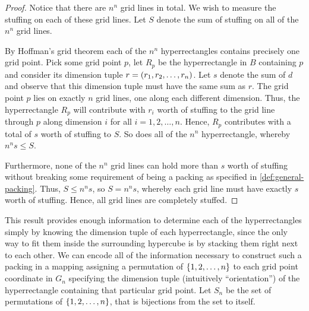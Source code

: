 \begin{proof}
Notice that there are $n^n$ grid lines in total. We wish to measure the stuffing on each of these grid lines. Let $S$ denote the sum of stuffing on all of the $n^n$ grid lines.

By Hoffman's grid theorem  each of the $n^n$ hyperrectangles contains precisely one grid point. Pick some grid point $p$, let $R_p$ be the hyperrectangle in $B$ containing $p$ and consider its dimension tuple $r = \left( r_1, r_2, \dotsc, r_n \right)$. Let $s$ denote the sum of $d$ and observe that this dimension tuple must have the same sum as $r$. The grid point $p$ lies on exactly $n$ grid lines, one along each different dimension. Thus, the hyperrectangle $R_p$ will contribute with $r_i$ worth of stuffing to the grid line through $p$ along dimension $i$ for all $i = 1, 2, \dotsc, n$. Hence, $R_p$ contributes with a total of $s$ worth of stuffing to $S$. So does all of the $n^n$ hyperrectangle, whereby $n^n s \leq S$.

Furthermore, none of the $n^n$ grid lines can hold more than $s$ worth of stuffing without breaking some requirement of being a packing as specified in \cref{def:general-packing}. Thus, $S \leq n^n s$, so $S = n^n s$, whereby each grid line must have exactly $s$ worth of stuffing. Hence, all grid lines are completely stuffed.
\end{proof}

\noindent This result provides enough information to determine each of the hyperrectangles simply by knowing the dimension tuple of each hyperrectangle, since the only way to fit them inside the surrounding hypercube is by stacking them right next to each other. We can encode all of the information necessary to construct such a packing in a mapping assigning a permutation of $\left\{ 1, 2, \dotsc, n \right\}$ to each grid point coordinate in $G_n$ specifying the dimension tuple (intuitively ``orientation'') of the hyperrectangle containing that particular grid point. Let $S_n$ be the set of permutations of $\left\{ 1, 2, \dotsc, n \right\}$, that is bijections from the set to itself.

\pagebreak
{}

